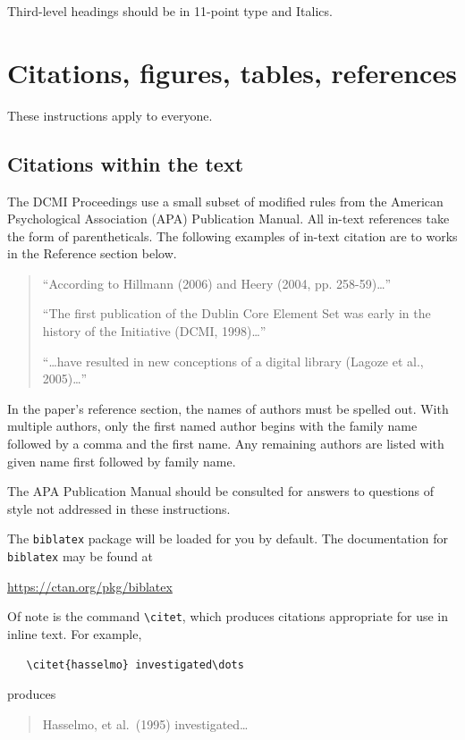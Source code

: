 \documentclass[11pt,a4paper]{article}
\begin{document}
Third-level headings should be in 11-point type and Italics.


\section{Citations, figures, tables, references}
\label{others}

These instructions apply to everyone.

\subsection{Citations within the text}

The DCMI Proceedings use a small subset of modified rules from the American Psychological Association (APA) Publication Manual.  All in-text references take the form of parentheticals.  The following examples of in-text citation are to works in the Reference section below.

\begin{quote}
“According to Hillmann (2006) and Heery (2004, pp. 258-59)…”

“The first publication of the Dublin Core Element Set was early in the history of the Initiative (DCMI, 1998)…”

“…have resulted in new conceptions of a digital library (Lagoze et al., 2005)…”
\end{quote}


In the paper’s reference section, the names of authors must be spelled out.  With multiple authors, only the first named author begins with the family name followed by a comma and the first name.  Any remaining authors are listed with given name first followed by family name.

The APA Publication Manual should be consulted for answers to questions of style not addressed in these instructions.

The \verb+biblatex+ package will be loaded for you by default. The documentation for \verb+biblatex+ may be found at
\begin{center}
\url{https://ctan.org/pkg/biblatex}
\end{center}
Of note is the command \verb+\citet+, which produces citations appropriate for
use in inline text.  For example,
\begin{verbatim}
   \citet{hasselmo} investigated\dots
\end{verbatim}
produces
\begin{quote}
  Hasselmo, et al.\ (1995) investigated\dots
\end{quote}
\end{document}
